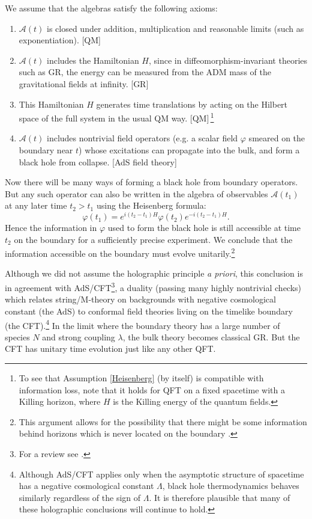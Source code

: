 \documentclass[12pt,a4paper]{article}
\def\be{\begin{equation}}
\def\ee{\end{equation}}
\begin{document}
We assume that the algebras satisfy the following axioms:
\begin{enumerate}
\item  $\mathcal{A}(t)$ is closed under addition, multiplication and reasonable limits (such as exponentiation).  [QM]
\item
$\mathcal{A}(t)$ includes the Hamiltonian $H$, since in diffeomorphism-invariant theories such as GR, the energy can be measured from the ADM mass \cite{Arnowitt:1962hi} of the gravitational fields at infinity.  [GR]
\item
This Hamiltonian $H$ generates time translations by acting on the Hilbert space of the full system in the usual QM way. \label{Heisenberg} [QM]\,\footnote{To see that Assumption \ref{Heisenberg} (by itself) is compatible with information loss, note that it holds for QFT on a fixed spacetime with a Killing horizon, where $H$ is the Killing energy of the quantum fields.}
\item
$\mathcal{A}(t)$ includes nontrivial field operators (e.g. a scalar field $\varphi$ smeared on the boundary near $t$) whose excitations can propagate into the bulk, and form a black hole from collapse.  [AdS field theory]
\end{enumerate}
Now there will be many ways of forming a black hole from boundary operators. But any such operator can also be written in the algebra of observables $\mathcal{A}(t_1)$ at any later time $t_2 > t_1$ using the Heisenberg formula:
\be
\varphi(t_1) = e^{i(t_2 - t_1)H} \varphi(t_2) e^{-i(t_2 - t_1)H}.
\ee
Hence the information in $\varphi$ used to form the black hole is still accessible at time $t_2$ on the boundary for a sufficiently precise experiment.  We conclude that the information accessible on the boundary must evolve unitarily.\footnote{This argument allows for the possibility that there might be some information behind horizons which is never located on the boundary \cite{Marolf:2012xe}.}

Although we did not assume the holographic principle \emph{a priori}, this conclusion is in agreement with AdS/CFT\footnote{For a review see \cite{Hubeny:2014bla}.}, a duality (passing many highly nontrivial checks) which relates string/M-theory on backgrounds with negative cosmological constant (the AdS) to conformal field theories living on the timelike boundary (the CFT).\footnote{Although AdS/CFT applies only when the asymptotic structure of spacetime has a negative cosmological constant $\Lambda$, black hole thermodynamics behaves similarly regardless of the sign of $\Lambda$.  It is therefore plausible that many of these holographic conclusions will continue to hold.}  In the limit where the boundary theory has a large number of species $N$ and strong coupling $\lambda$, the bulk theory becomes classical GR.  But the CFT has unitary time evolution just like any other QFT.
\end{document}

